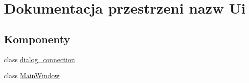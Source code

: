 \hypertarget{namespace_ui}{}\section{Dokumentacja przestrzeni nazw Ui}
\label{namespace_ui}
\subsection*{Komponenty}
\begin{DoxyCompactItemize}
\item 
class \hyperlink{class_ui_1_1dialog__connection}{dialog\+\_\+connection}
\item 
class \hyperlink{class_ui_1_1_main_window}{Main\+Window}
\end{DoxyCompactItemize}
